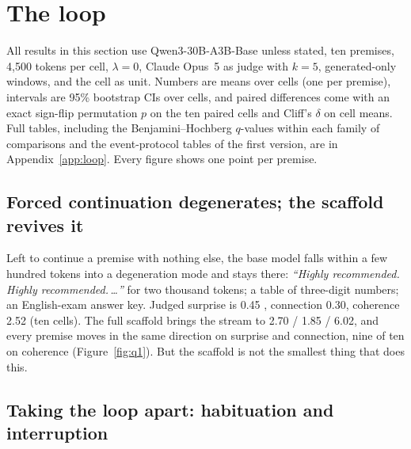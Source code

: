 \section{The loop}
\label{sec:loop}

All results in this section use Qwen3-30B-A3B-Base unless stated, ten
premises, 4,500 tokens per cell, $\lambda=0$, Claude Opus~5 as judge with
$k=5$, generated-only windows, and the cell as unit. Numbers are means over
cells (one per premise), intervals are 95\% bootstrap CIs over cells, and
paired differences come with an exact sign-flip permutation $p$ on the ten
paired cells and Cliff's $\delta$ on cell means. Full tables, including the
Benjamini--Hochberg $q$-values within each family of comparisons and the
event-protocol tables of the first version, are in Appendix~\ref{app:loop}.
Every figure shows one point per premise.

\subsection{Forced continuation degenerates; the scaffold revives it}

Left to continue a premise with nothing else, the base model falls within a
few hundred tokens into a degeneration mode and stays there: \emph{``Highly
recommended. Highly recommended.\,\ldots''} for two thousand tokens; a table
of three-digit numbers; an English-exam answer key. Judged surprise is 0.45
, connection 0.30, coherence 2.52 (ten cells). The full
scaffold brings the stream to 2.70 / 1.85 / 6.02, and every premise moves in
the same direction on surprise and connection, nine of ten on coherence (Figure~\ref{fig:q1}). But the scaffold is not the
smallest thing that does this.

\subsection{Taking the loop apart: habituation and interruption}
\label{sec:ablation}

